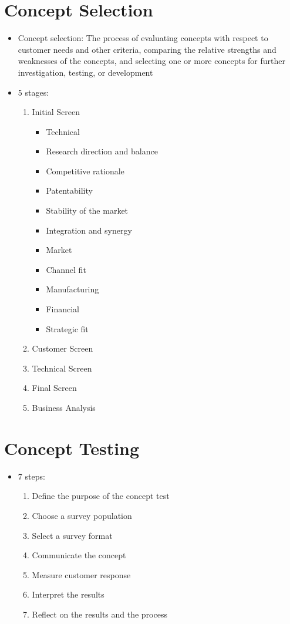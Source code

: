 \documentclass[openany,12pt,a4paper]{book}
\begin{document}
\section{Concept Selection}
\begin{itemize}
    \item Concept selection: The process of evaluating concepts with respect to customer needs and other criteria, comparing the relative strengths and weaknesses of the concepts, and selecting one or more concepts for further investigation, testing, or development
    \item 5 stages:
    \begin{enumerate}
        \item Initial Screen
        \begin{itemize}
            \item Technical
            \item Research direction and balance
            \item Competitive rationale
            \item Patentability
            \item Stability of the market
            \item Integration and synergy
            \item Market
            \item Channel fit
            \item Manufacturing
            \item Financial
            \item Strategic fit
        \end{itemize}
        \item Customer Screen
        \item Technical Screen
        \item Final Screen
        \item Business Analysis
    \end{enumerate}
\end{itemize}

\section{Concept Testing}
\begin{itemize}
    \item 7 steps:
    \begin{enumerate}
        \item Define the purpose of the concept test
        \item Choose a survey population
        \item Select a survey format
        \item Communicate the concept
        \item Measure customer response
        \item Interpret the results
        \item Reflect on the results and the process
    \end{enumerate}
\end{itemize}
\end{document}

